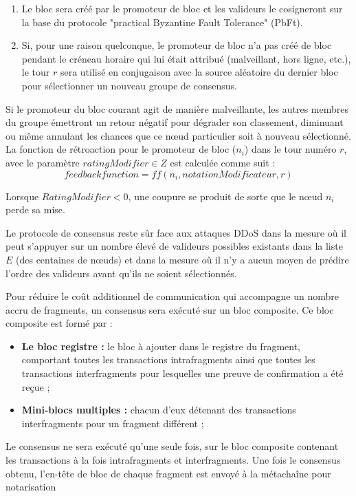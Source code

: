 \documentclass[journal]{IEEEtran}
\begin{document}
\begin{enumerate}
\item Le bloc sera créé par le promoteur de bloc et les valideurs le cosigneront sur la base du protocole "practical Byzantine Fault Tolerance"  (PbFt).

\item  Si, pour une raison quelconque, le promoteur de bloc n'a pas créé de bloc pendant le créneau horaire qui lui était attribué (malveillant, hors ligne, etc.), le tour $r$ sera utilisé en conjugaison avec la source aléatoire du dernier bloc pour sélectionner un nouveau groupe de consensus.

\end{enumerate}

Si le promoteur du bloc courant agit de manière malveillante, les autres membres du groupe émettront un retour négatif pour dégrader son classement, diminuant ou même annulant les chances que ce nœud particulier soit à nouveau sélectionné. La fonction de rétroaction pour le promoteur de bloc (${n}_{i}$) dans le tour numéro $r$, avec le paramètre  $ratingModifier \in Z$  est calculée comme suit :
\[feedbackfunction = ff ({n}_{i}, notationModificateur, r)\]

Lorsque $RatingModifier < 0$, une coupure se produit de sorte que le nœud ${n}_{i}$ perde sa mise.

Le protocole de consensus reste sûr face aux attaques DDoS dans la mesure où il peut s'appuyer sur un nombre élevé de valideurs possibles existants dans la liste $E$ (des centaines de nœuds) et dans la mesure où il n'y a aucun moyen de prédire l'ordre des valideurs avant qu'ils ne soient sélectionnés.

Pour réduire le coût additionnel de communication qui accompagne un nombre accru de fragments, un consensus sera exécuté sur un bloc composite. Ce bloc composite est formé par :
\begin{itemize}
  \item \textbf{Le bloc registre :}  le bloc à ajouter dans le registre du fragment, comportant toutes les transactions intrafragments ainsi que toutes les transactions interfragments pour lesquelles une preuve de confirmation a été reçue ;
  \item \textbf{Mini-blocs multiples :}  chacun d'eux détenant des transactions interfragments pour un fragment différent ;
\end{itemize}
Le consensus ne sera exécuté qu'une seule fois, sur le bloc composite contenant les transactions à la fois intrafragments et interfragments. Une fois le consensus obtenu, l'en-tête de bloc de chaque fragment est envoyé à la métachaîne pour notarisation
\end{document}
